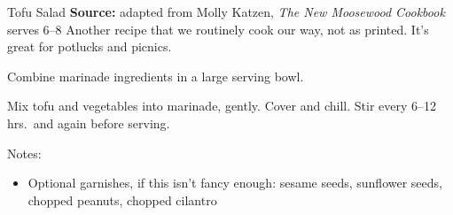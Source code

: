 \begin{recipe}{Tofu Salad}{}%
 {\textbf{Source:} adapted from Molly Katzen, \textit{The New Moosewood Cookbook} \hfill serves 6--8}
 \freeform Another recipe that we routinely cook our way, not as printed. It's great for potlucks and picnics.

 Combine marinade ingredients in a large serving bowl.

 Mix tofu and vegetables into marinade, gently. Cover and chill. Stir every 6--12 hrs.\ and again before serving.

 \freeform Notes:
 \begin{itemize}
  \item Optional garnishes, if this isn't fancy enough: sesame seeds, sunflower seeds, chopped peanuts, chopped cilantro
 \end{itemize}

\end{recipe}

